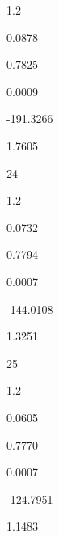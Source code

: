 \documentclass[a4paper,portrait,12pt]{article}
\begin{document}
1.2





0.0878





0.7825





0.0009





-191.3266





1.7605





24





1.2





0.0732





0.7794





0.0007





-144.0108





1.3251





25





1.2





0.0605





0.7770





0.0007





-124.7951





1.1483
\end{document}
